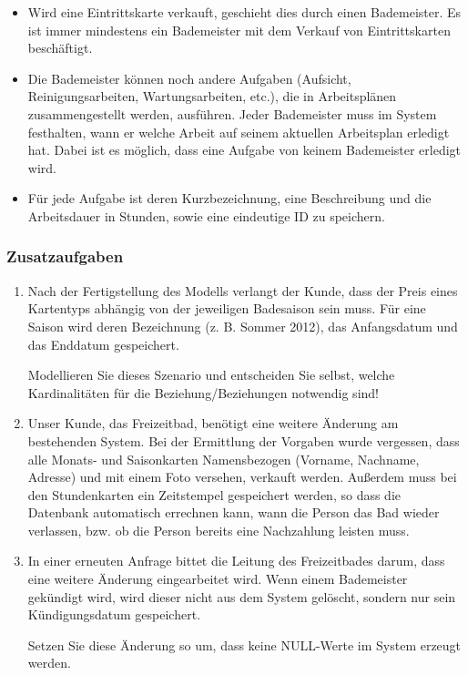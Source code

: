 \begin{itemize}
            \item Wird eine Eintrittskarte verkauft, geschieht dies durch einen Bademeister. Es ist immer mindestens ein Bademeister mit dem Verkauf von Eintrittskarten besch\"aftigt.
\clearpage
            \item Die Bademeister k\"onnen noch andere Aufgaben (Aufsicht, Reinigungsarbeiten,
            Wartungsarbeiten, etc.), die in Arbeitspl\"anen zusammengestellt werden, ausf\"uhren. Jeder Bademeister muss im System festhalten, wann er welche Arbeit auf seinem aktuellen Arbeitsplan erledigt hat. Dabei ist es m\"oglich, dass eine Aufgabe von keinem Bademeister erledigt wird.
            \item F\"ur jede Aufgabe ist deren Kurzbezeichnung, eine Beschreibung und die
            Arbeitsdauer in Stunden, sowie eine eindeutige ID zu speichern.
          \end{itemize}

        \subsubsection{Zusatzaufgaben}
          \begin{enumerate} %
            \item Nach der Fertigstellung des Modells verlangt der Kunde, dass der Preis eines
            Kartentyps abh\"angig von der jeweiligen Badesaison sein muss. F\"ur eine Saison wird deren
            Bezeichnung (z. B. Sommer 2012), das Anfangsdatum und das Enddatum gespeichert.

            Modellieren Sie dieses Szenario und entscheiden Sie selbst, welche Kardinalit\"aten f\"ur die
            Beziehung/Beziehungen notwendig sind!

            \item Unser Kunde, das Freizeitbad, ben\"otigt eine weitere \"Anderung am bestehenden System.
            Bei der Ermittlung der Vorgaben wurde vergessen, dass alle Monats- und Saisonkarten
            Namensbezogen (Vorname, Nachname, Adresse) und mit einem Foto versehen, verkauft werden.
            Au\ss{}erdem muss bei den Stundenkarten ein Zeitstempel gespeichert werden, so dass die
            Datenbank automatisch errechnen kann, wann die Person das Bad wieder verlassen, bzw. ob die
            Person bereits eine Nachzahlung leisten muss.

            \item In einer erneuten Anfrage bittet die Leitung des Freizeitbades darum, dass eine weitere
            \"Anderung eingearbeitet wird. Wenn einem Bademeister gek\"undigt wird, wird dieser nicht aus
            dem System gel\"oscht, sondern nur sein K\"undigungsdatum gespeichert.

            Setzen Sie diese \"Anderung so um, dass keine NULL-Werte im System erzeugt werden.
          \end{enumerate}%
\clearpage
